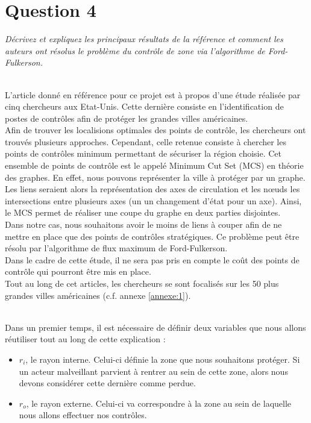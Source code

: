 \section{Question 4}
\textit{Décrivez et expliquez les principaux résultats de la référence \cite{tiquette} et comment les auteurs ont résolus le problème du contrôle de zone via l'algorithme de Ford-Fulkerson.}\\~\\\par
L'article donné en référence pour ce projet est à propos d'une étude réalisée par cinq chercheurs aux Etat-Unis. Cette dernière consiste en l'identification de postes de contrôles afin de protéger les grandes villes américaines.\\
Afin de trouver les localisions optimales des points de contrôle, les chercheurs ont trouvés plusieurs approches. Cependant, celle retenue consiste à chercher les points de contrôles minimum permettant de sécuriser la région choisie. Cet ensemble de points de contrôle est le appelé Minimum Cut Set (MCS) en théorie des graphes. En effet, nous pouvons représenter la ville à protéger par un graphe. Les liens seraient alors la représentation des axes de circulation et les nœuds les intersections entre plusieurs axes (un un changement d'état pour un axe). Ainsi, le MCS permet de réaliser une coupe du graphe en deux parties disjointes.\\
Dans notre cas, nous souhaitons avoir le moins de liens à couper afin de ne mettre en place que des points de contrôles stratégiques. Ce problème peut être résolu par l'algorithme de flux maximum de Ford-Fulkerson.\\
Dans le cadre de cette étude, il ne sera pas pris en compte le coût des points de contrôle qui pourront être mis en place.\\
Tout au long de cet articles, les chercheurs se sont focalisés sur les 50 plus grandes villes américaines (c.f. annexe \ref{annexe:1}).\\~\\\par
Dans un premier temps, il est nécessaire de définir deux variables que nous allons réutiliser tout au long de cette explication :
\begin{itemize}
 \item $r_i$, le rayon interne. Celui-ci définie la zone que nous souhaitons protéger. Si un acteur malveillant parvient à rentrer au sein de cette zone, alors nous devons considérer cette dernière comme perdue.
 \item $r_o$, le rayon externe. Celui-ci va correspondre à la zone au sein de laquelle nous allons effectuer nos contrôles.
\end{itemize}
